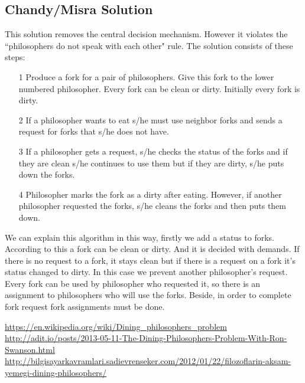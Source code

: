\documentclass[12pt]{article}
\begin{document}
 \subsection*{Chandy/Misra Solution}
 \begin{flushleft}
  This solution removes the central decision mechanism. However it violates the ``philosophers do not speak with each other" 
  rule. The solution consists of these steps:
  \begin{itemize}
   \item[1] Produce a fork for a pair of philosophers. Give this fork to the lower numbered philosopher. Every fork can 
   be clean or dirty. Initially every fork is dirty.
   \item[2] If a philosopher wants to eat s/he must use neighbor forks and sends a request for forks that s/he does not have.
   \item[3] If a philosopher gets a request, s/he checks the status of the forks and if they are clean s/he continues 
   to use them but if they are dirty, s/he puts down the forks.
   \item[4] Philosopher marks the fork as a dirty after eating. However, if another philosopher requested the forks, s/he 
   cleans the forks and then puts them down.
  \end{itemize}
  We can explain this algorithm in this way, firstly we add a status to forks. According to this a fork can be clean or dirty. And it is 
  decided with demands. If there is no request to a fork, it stays clean but if there is a request on a fork it's status 
  changed to dirty. In this case we prevent another philosopher's request. Every fork can be used by philosopher who requested 
  it, so there is an assignment to philosophers who will use the forks. Beside, in order to complete fork request fork assignments 
  must be done. 
 \end{flushleft}
 \pagebreak
 \begin{thebibliography}{9}
    \url{https://en.wikipedia.org/wiki/Dining_philosophers_problem}
    \url{http://adit.io/posts/2013-05-11-The-Dining-Philosophers-Problem-With-Ron-Swanson.html}
    \url{http://bilgisayarkavramlari.sadievrenseker.com/2012/01/22/filozoflarin-aksam-yemegi-dining-philosophers/}
 \end{thebibliography}
\end{document}

